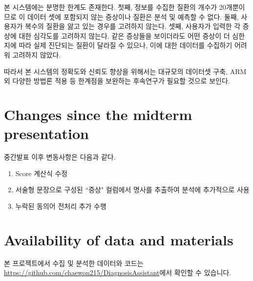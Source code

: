 \documentclass[conference]{IEEEtran}
\begin{document}
본 시스템에는 분명한 한계도 존재한다. 첫째, 정보를 수집한 질환의 개수가 20개뿐이므로 이 데이터 셋에 포함되지 않는 증상이나 질환은 분석 및 예측할 수 없다. 둘째, 사용자가 복수의 질환을 앓고 있는 경우를 고려하지 않는다. 셋째, 사용자가 입력한 각 증상에 대한 심각도를 고려하지 않는다. 같은 증상들을 보이더라도 어떤 증상이 더 심한지에 따라 실제 진단되는 질환이 달라질 수 있으나, 이에 대한 데이터를 수집하기 어려워 고려하지 않았다.

따라서 본 시스템의 정확도와 신뢰도 향상을 위해서는 대규모의 데이터셋 구축, ARM 외 다양한 방법론 적용 등 한계점을 보완하는 후속연구가 필요할 것으로 보인다.


\section*{Changes since the midterm presentation}

중간발표 이후 변동사항은 다음과 같다.
\begin{enumerate}
    \item Score 계산식 수정
    \item 서술형 문장으로 구성된 ``증상" 컬럼에서 명사를 추출하여 분석에 추가적으로 사용
    \item 누락된 동의어 전처리 추가 수행
\end{enumerate}

\section*{Availability of data and materials}
본 프로젝트에서 수집 및 분석한 데이터와 코드는 \href{https://github.com/chaewon215/DiagnosisAssistant}{https://github.com/chaewon215/DiagnosisAssistant}에서 확인할 수 있습니다.
\end{document}
